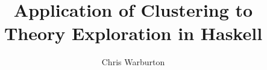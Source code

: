 \documentclass[]{article}
\begin{document}
\pagestyle{headings}  %

\title{Application of Clustering to Theory Exploration in Haskell}

\author{Chris Warburton}


\maketitle              %



\citep{hughes1989functional}



\end{document}
